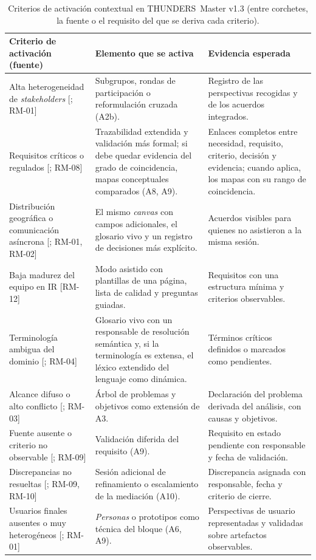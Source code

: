 \documentclass[12pt,letterpaper,oneside]{report}
\begin{document}
\begin{table}[H]
\caption{Criterios de activación contextual en THUNDERS~Master v1.3 (entre
corchetes, la fuente o el requisito del que se deriva cada criterio).}
\label{tab:activacion}
\centering
\footnotesize
\renewcommand{\arraystretch}{1.12}
\begin{tabularx}{\textwidth}{@{}Y Y Y@{}}
\toprule
\textbf{Criterio de activación (fuente)} & \textbf{Elemento que se activa} &
\textbf{Evidencia esperada} \\
\midrule
Alta heterogeneidad de \textit{stakeholders} [\cite{khan2022stakeholders}; RM-01]
& Subgrupos, rondas de participación o reformulación cruzada (A2b).
& Registro de las perspectivas recogidas y de los acuerdos integrados. \\
\addlinespace
Requisitos críticos o regulados [\cite{fucci2022traceability}; RM-08]
& Trazabilidad extendida y validación más formal; si debe quedar evidencia del
  grado de coincidencia, mapas conceptuales comparados (A8, A9).
& Enlaces completos entre necesidad, requisito, criterio, decisión y evidencia;
  cuando aplica, los mapas con su rango de coincidencia. \\
\addlinespace
Distribución geográfica o comunicación asíncrona [\cite{khan2022stakeholders};
RM-01, RM-02]
& El mismo \textit{canvas} con campos adicionales, el glosario vivo y un registro
  de decisiones más explícito.
& Acuerdos visibles para quienes no asistieron a la misma sesión. \\
\addlinespace
Baja madurez del equipo en IR [RM-12]
& Modo asistido con plantillas de una página, lista de calidad y preguntas
  guiadas.
& Requisitos con una estructura mínima y criterios observables. \\
\addlinespace
Terminología ambigua del dominio [\cite{ribeiro2020}; RM-04]
& Glosario vivo con un responsable de resolución semántica y, si la
  terminología es extensa, el léxico extendido del lenguaje como dinámica.
& Términos críticos definidos o marcados como pendientes. \\
\addlinespace
Alcance difuso o alto conflicto [\cite{fuller2021blurring,khan2022stakeholders};
RM-03]
& Árbol de problemas y objetivos como extensión de A3.
& Declaración del problema derivada del análisis, con causas y objetivos. \\
\addlinespace
Fuente ausente o criterio no observable [\cite{iso29148}; RM-09]
& Validación diferida del requisito (A9).
& Requisito en estado pendiente con responsable y fecha de validación. \\
\addlinespace
Discrepancias no resueltas [\cite{iso29148,fuller2021blurring}; RM-09, RM-10]
& Sesión adicional de refinamiento o escalamiento de la mediación (A10).
& Discrepancia asignada con responsable, fecha y criterio de cierre. \\
\addlinespace
Usuarios finales ausentes o muy heterogéneos [\cite{khan2022stakeholders}; RM-01]
& \textit{Personas} o prototipos como técnica del bloque (A6, A9).
& Perspectivas de usuario representadas y validadas sobre artefactos
  observables. \\
\bottomrule
\end{tabularx}
\end{table}
\end{document}
